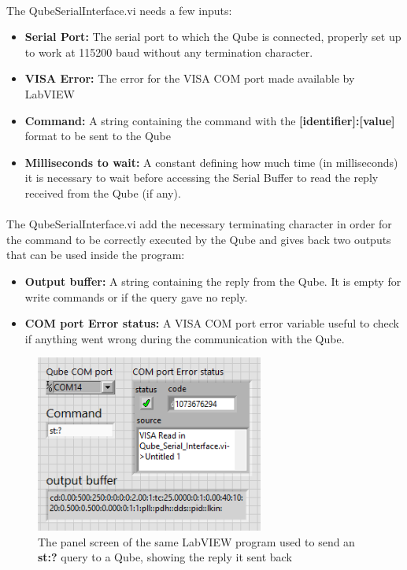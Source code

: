 \paragraph{} The Qube\textunderscore Serial\textunderscore Interface.vi needs a few inputs:
\begin{itemize}
    \item \textbf{Serial Port:} The serial port to which the Qube is connected, properly set up to work at 115200 baud without any termination character.
    \item \textbf{VISA Error:} The error for the VISA COM port made available by LabVIEW
    \item \textbf{Command:} A string containing the command with the \textbf{[identifier]:[value]} format to be sent to the Qube
    \item \textbf{Milliseconds to wait:} A constant defining how much time (in milliseconds) it is necessary to wait before accessing the Serial Buffer to read the reply received from the Qube (if any).
\end{itemize}

\paragraph{} The Qube\textunderscore Serial\textunderscore Interface.vi add the necessary terminating character in order for the command to be correctly executed by the Qube and gives back two outputs that can be used inside the program:

\begin{itemize}
    \item \textbf{Output buffer:} A string containing the reply from the Qube. It is empty for write commands or if the query gave no reply.
    \item \textbf{COM port Error status:} A VISA COM port error variable useful to check if anything went wrong during the communication with the Qube.
\end{itemize}

\begin{figure}[h]
    \centering
    \includegraphics[width=7.5cm]{images/LabVIEW_CP_example.png}
    \caption{The panel screen of the same LabVIEW program used to send an \textbf{st:?} query to a Qube, showing the reply it sent back}
    \label{LabVIEW_CP_example}
\end{figure}


